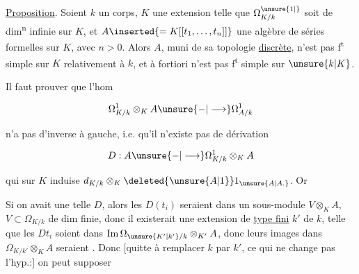 
\uline{Proposition}. Soient $k$ un corps, $K$ une extension telle que $\Omega^{\unsure{1|\vphantom{1}}}_{K/k}$ soit de dim\textsuperscript{n} infinie sur $K$, et $A\inserted{=K[[t_1,\ldots,t_n]]}$ une algèbre de séries formelles sur $K$, avec $n>0$. Alors $A$, muni de sa topologie \uline{discrète}, n'est pas f\textsuperscript{t} simple sur $K$ relativement à $k$, et à fortiori n'est pas f\textsuperscript{t} simple sur $\unsure{k|K}$.

Il faut prouver que l'hom

\[ \Omega^1_{K/k}\otimes_K A\unsure{-|\longrightarrow}\Omega^1_{A/k} \]

n'a pas d'inverse à gauche, i.e. qu'il n'existe pas de dérivation

\[ D:A\unsure{-|\longrightarrow}\Omega^1_{K/k}\otimes_K A \]

qui sur $K$ induise $d_{K/k}\otimes_K\deleted{\unsure{A|1}}1_{\unsure{A|A.}}$. Or

Si on avait une telle $D$, alors les $D(t_i)$ seraient dans un sous-module $V\otimes_K A$, $V\subset\Omega_{K/k}$ de dim finie, donc il existerait une extension de \uline{type fini} $k'$ de $k$, telle que les $Dt_i$ soient dans $\operatorname{Im}\Omega_{\unsure{K'|k'}/k}\otimes_{K'}A$, donc leurs images dans $\Omega_{K/k'}\otimes_K A$ seraient . Donc [quitte à remplacer $k$ par $k'$, ce qui ne change pas l'hyp.:] on peut supposer

